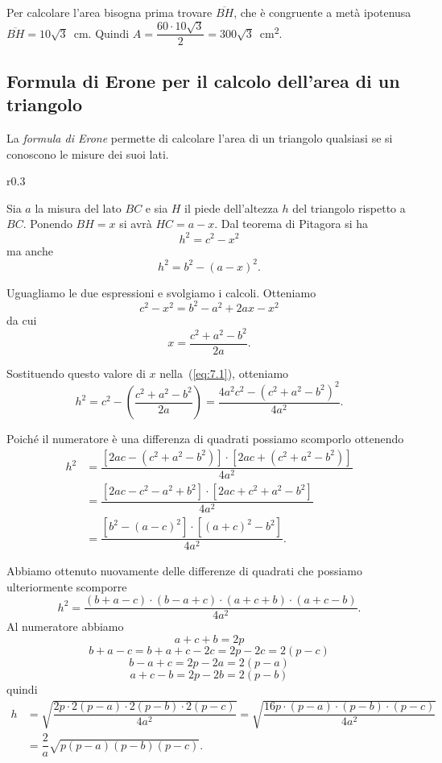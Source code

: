 \begin{exrig}
\begin{esempio}
Per calcolare l'area bisogna prima trovare $\overline{BH}$, che è 
congruente a metà ipotenusa $\overline{BH}=10\sqrt{3}$~cm. Quindi 
$A=\dfrac{60\cdot 10\sqrt{3}}{2}=300\sqrt{3}$~cm\textsuperscript{2}.
\end{esempio}
\end{exrig}

\subsection{Formula di Erone per il calcolo dell'area di un triangolo}

La \emph{formula di Erone} permette di calcolare l'area di un 
triangolo qualsiasi se si conoscono le misure dei suoi lati.

\begin{wrapfigure}{r}{0.3\textwidth}
	\centering
	\vspace{10pt}
\end{wrapfigure}
Sia $a$ la misura del lato $BC$ e sia $H$ il piede dell'altezza $h$ 
del triangolo rispetto a $BC$. Ponendo $BH = x$ si avrà $HC = a - x$.
Dal teorema di Pitagora si ha
\begin{equation}\label{eq:7.1}
h^2=c^2-x^2
\end{equation}
ma anche
\[h^2=b^2-(a-x)^2.\]

Uguagliamo le due espressioni e svolgiamo i calcoli. Otteniamo
\[c^2-x^2=b^2-a^2+2ax-x^2\]
da cui
\[x=\dfrac{c^2+a^2-b^2}{2a}.\]

Sostituendo questo valore di $x$ nella~(\ref{eq:7.1}), otteniamo
\[h^2=c^2-\left(\dfrac{c^2+a^2-b^2}{2a}\right)=\dfrac{
4a^2c^2-\left(c^2+a^2-b^2\right)^2}{4a^2}.\]

Poiché il numeratore è una differenza di quadrati possiamo scomporlo 
ottenendo
\begin{align*}
h^2&=\dfrac{\left[2ac-\left(c^2+a^2-b^2\right)\right]\cdot\left[
2ac+\left(c^2+a^2-b^2\right)\right]}{4a^2}\\
&=\dfrac{\left[2ac-c^2-a^2+b^2\right]\cdot\left[2ac+c^2+a^2-b^2\right]
}{4a^2}\\
&=\dfrac{\left[b^2-(a-c)^2\right]\cdot\left[(a+c)^2-b^2\right]}{4a^2}.
\end{align*}

Abbiamo ottenuto nuovamente delle differenze di quadrati che possiamo 
ulteriormente scomporre
\[h^2=\dfrac{(b+a-c)\cdot(b-a+c)\cdot(a+c+b)\cdot(a+c-b)}{4a^2}.\]
Al numeratore abbiamo
\[a + c + b = 2p\]
\[b + a - c = b+a+c-2c = 2p-2c = 2(p-c)\]
\[b - a + c = 2p - 2a = 2 (p - a)\]
\[a + c - b = 2p - 2b = 2(p - b)\]
quindi
\begin{align*}
h&=\sqrt{\dfrac{2p\cdot 2(p-a) \cdot 2(p-b) \cdot 
2(p-c)}{4a^2}}=\sqrt{\dfrac{16p\cdot (p-a) \cdot (p-b) \cdot 
(p-c)}{4a^2}}\\
&=\dfrac{2}{a}\sqrt{p(p-a)(p-b)(p-c)}.
\end{align*}

